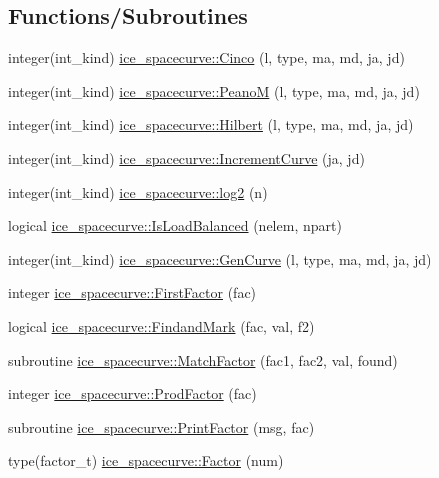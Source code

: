 \subsection*{Functions/Subroutines}
\begin{DoxyCompactItemize}
\item 
integer(int\_\-kind) \hyperlink{namespaceice__spacecurve_a03cdfff51ffab50dee8974ba594b53bb}{ice\_\-spacecurve::Cinco} (l, type, ma, md, ja, jd)
\item 
integer(int\_\-kind) \hyperlink{namespaceice__spacecurve_afe83a0d2757c7c07a40d410b98e66728}{ice\_\-spacecurve::PeanoM} (l, type, ma, md, ja, jd)
\item 
integer(int\_\-kind) \hyperlink{namespaceice__spacecurve_aceffac45ebe5bc652860f543913c8c83}{ice\_\-spacecurve::Hilbert} (l, type, ma, md, ja, jd)
\item 
integer(int\_\-kind) \hyperlink{namespaceice__spacecurve_a3b9b759e23a9275195d27bdf3b78ebfa}{ice\_\-spacecurve::IncrementCurve} (ja, jd)
\item 
integer(int\_\-kind) \hyperlink{namespaceice__spacecurve_a2010d172fdabf272358d0f809c046175}{ice\_\-spacecurve::log2} (n)
\item 
logical \hyperlink{namespaceice__spacecurve_a2f6ae79d60cad9d3e019550e76cb5706}{ice\_\-spacecurve::IsLoadBalanced} (nelem, npart)
\item 
integer(int\_\-kind) \hyperlink{namespaceice__spacecurve_ae30af6486456c0f4098a6c03aea8ec6d}{ice\_\-spacecurve::GenCurve} (l, type, ma, md, ja, jd)
\item 
integer \hyperlink{namespaceice__spacecurve_a6c86eb0e04276a6417a2010753af3895}{ice\_\-spacecurve::FirstFactor} (fac)
\item 
logical \hyperlink{namespaceice__spacecurve_a269b5f206b1895faa78dfb38c8a5cc4e}{ice\_\-spacecurve::FindandMark} (fac, val, f2)
\item 
subroutine \hyperlink{namespaceice__spacecurve_a873b84a1b720159b0a0d4dd6a4f1df1c}{ice\_\-spacecurve::MatchFactor} (fac1, fac2, val, found)
\item 
integer \hyperlink{namespaceice__spacecurve_a57f86858b3f4450ed95750ff8405f12f}{ice\_\-spacecurve::ProdFactor} (fac)
\item 
subroutine \hyperlink{namespaceice__spacecurve_a64dc0958c7c88a5de6316e7c2f6189b5}{ice\_\-spacecurve::PrintFactor} (msg, fac)
\item 
type(factor\_\-t) \hyperlink{namespaceice__spacecurve_a0e21c6fb09762431569057a3a6a1ceac}{ice\_\-spacecurve::Factor} (num)
\item 

\end{DoxyCompactItemize}
